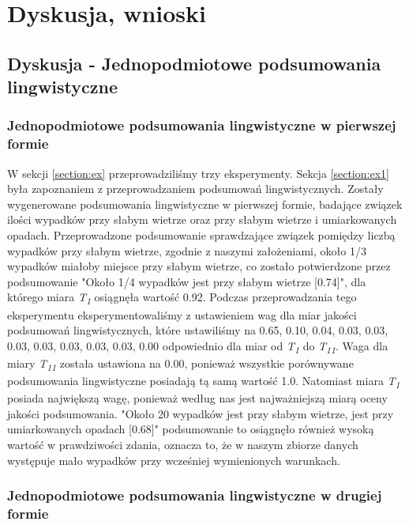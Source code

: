 \documentclass{classrep}
\begin{document}
\newpage


\section{Dyskusja, wnioski}
\subsection{Dyskusja - Jednopodmiotowe podsumowania lingwistyczne}

\subsubsection{Jednopodmiotowe podsumowania lingwistyczne w pierwszej formie}

W sekcji \ref{section:ex} przeprowadziliśmy trzy eksperymenty. Sekcja \ref{section:ex1} była zapoznaniem z przeprowadzaniem podsumowań lingwistycznych. Zostały wygenerowane podsumowania lingwistyczne w pierwszej formie, badające związek ilości wypadków przy słabym wietrze oraz przy słabym wietrze i umiarkowanych opadach. Przeprowadzone podsumowanie sprawdzające związek pomiędzy liczbą wypadków przy słabym wietrze, zgodnie z naszymi założeniami, około 1/3 wypadków miałoby miejsce przy słabym wietrze, co zostało potwierdzone przez podsumowanie "Około 1/4 wypadków jest przy słabym wietrze [0.74]", dla którego miara \textit{T\textsubscript{1}} osiągnęła wartość 0.92. Podczas przeprowadzania tego eksperymentu eksperymentowaliśmy z ustawieniem wag dla miar jakości podsumowań lingwistycznych, które ustawiliśmy na 0.65, 0.10, 0.04, 0.03, 0.03, 0.03, 0.03, 0.03, 0.03, 0.03, 0.00 odpowiednio dla miar od \textit{T\textsubscript{1}} do \textit{T\textsubscript{11}}. Waga dla miary \textit{T\textsubscript{11}} została ustawiona na 0.00, ponieważ wszystkie porównywane podsumowania lingwistyczne posiadają tą samą wartość 1.0. Natomiast miara \textit{T\textsubscript{1}} posiada największą wagę, ponieważ według nas jest najważniejszą miarą oceny jakości podsumowania. "Około 20 wypadków jest przy słabym wietrze, jest przy umiarkowanych opadach [0.68]" podsumowanie to osiągnęło również wysoką wartość w prawdziwości zdania, oznacza to, że w naszym zbiorze danych występuje mało wypadków przy wcześniej wymienionych warunkach. \\

\subsubsection{Jednopodmiotowe podsumowania lingwistyczne w drugiej formie}
\end{document}
